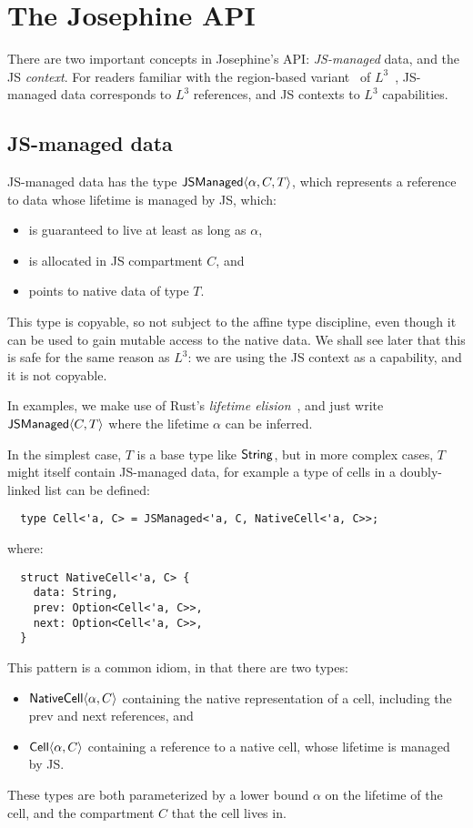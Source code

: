 \section{The Josephine API}

There are two important concepts in Josephine's API: \emph{JS-managed} data,
and the JS \emph{context}. For readers familiar with the region-based
variant~\cite{l3-with-regions} of $L^3$~\cite{l3}, JS-managed data
corresponds to $L^3$ references, and JS contexts to $L^3$ capabilities.

\subsection{JS-managed data}

JS-managed data has the type $\mathsf{JSManaged}\langle \alpha, C, T\rangle$, which represents
a reference to data whose lifetime is managed by JS, which:
\begin{itemize}

\item is guaranteed to live at least as long as $\alpha$,
\item is allocated in JS compartment $C$, and
\item points to native data of type $T$.
  
\end{itemize}
This type is copyable, so not subject to the affine type discipline,
even though it can be used to gain mutable access to the native
data. We shall see later that this is safe for the same reason as
$L^3$: we are using the JS context as a capability, and it is not
copyable.

In examples, we make use of Rust's \emph{lifetime elision}~\cite[\S3.4]{rustinomicon},
and just write $\mathsf{JSManaged}\langle C,T\rangle$ where the lifetime $\alpha$ can be
inferred.

In the simplest case, $T$ is a base type like $\mathsf{String}$, but in more complex
cases, $T$ might itself contain JS-managed data, for example a type of
cells in a doubly-linked list can be defined:
\begin{verbatim}
  type Cell<'a, C> = JSManaged<'a, C, NativeCell<'a, C>>;
\end{verbatim}
where:
\begin{verbatim}
  struct NativeCell<'a, C> {
    data: String,
    prev: Option<Cell<'a, C>>,
    next: Option<Cell<'a, C>>,
  }
\end{verbatim}
This pattern is a common idiom, in that there are two types:
\begin{itemize}
\item $\mathsf{NativeCell}\langle \alpha,C\rangle$ containing the native representation
of a cell, including the prev and next
references, and
\item $\mathsf{Cell}\langle \alpha,C\rangle$ containing a reference to a native cell,
whose lifetime is managed by JS.
\end{itemize}
These types are both parameterized by a lower bound $\alpha$ on the lifetime
of the cell, and the compartment $C$ that the cell lives in.

